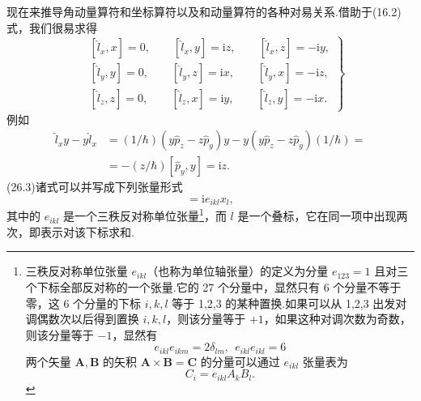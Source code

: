 现在来推导角动量算符和坐标算符以及和动量算符的各种对易关系.借助于(16.2)式，我们很易求得
\begin{equation}
\left.\begin{aligned}
  &[\hat{l}_x,x]=0,\qquad[\hat{l}_x,y]=\mathrm{i}z,\qquad[\hat{l}_x,z]=-\mathrm{i}y,\\
  &[\hat{l}_y,y]=0,\qquad[\hat{l}_y,z]=\mathrm{i}x,\qquad[\hat{l}_y,x]=-\mathrm{i}z,\\
  &[\hat{l}_z,z]=0,\qquad[\hat{l}_z,x]=\mathrm{i}y,\qquad[\hat{l}_z,y]=-\mathrm{i}x.
\end{aligned}\right\}
\end{equation}
例如
\begin{equation*}
\begin{aligned}
  \hat{l}_xy-y\hat{l}_x
  &=(1/\hbar)\left(y\hat{p}_z-z\hat{p}_y\right)y
  -y\left(y\hat{p}_z-z\hat{p}_y\right)(1/\hbar)=\\
  &=-\left(z/\hbar\right)\left[\hat{p}_y,y\right]=\mathrm{i}z.
\end{aligned}
\end{equation*}
(26.3)诸式可以并写成下列张量形式
\begin{equation}
  [\hat{l}_i,x_k]=\mathrm{i}e_{ikl}x_l,
\end{equation}
其中的 $e_{ikl}$ 是一个三秩反对称单位张量\footnote{三秩反对称单位张量 $e_{ikl}$（也称为单位轴张量）的定义为分量 $e_{123}=1$ 且对三个下标全部反对称的一个张量.它的 27 个分量中，显然只有 6 个分量不等于零，这 6 个分量的下标 $i,k,l$ 等于 1,2,3 的某种置换.如果可以从 1,2,3 出发对调偶数次以后得到置换 $i,k,l$，则该分量等于 $+1$，如果这种对调次数为奇数，则该分量等于 $-1$，显然有
\begin{equation*}
  e_{ikl}e_{ikm}=2\delta_{lm},\ \ e_{ikl}e_{ikl}=6
\end{equation*}
两个矢量 $\boldsymbol{A},\boldsymbol{B}$ 的矢积 $\boldsymbol{A}\times\boldsymbol{B}=\boldsymbol{C}$ 的分量可以通过 $e_{ikl}$ 张量表为
\begin{equation*}
  C_i=e_{ikl}A_kB_l.
\end{equation*}}，而 $l$ 是一个叠标，它在同一项中出现两次，即表示对该下标求和.


